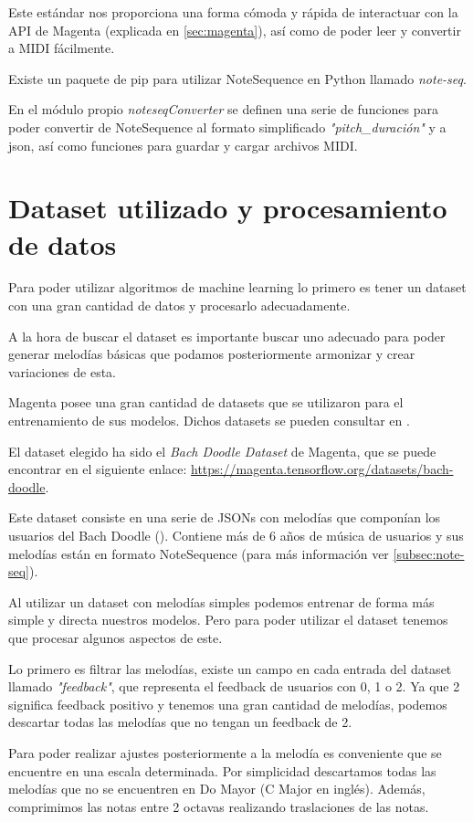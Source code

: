     Este estándar nos proporciona una forma cómoda y rápida de interactuar con la API de Magenta (explicada en \ref{sec:magenta}), así como de poder leer y convertir a MIDI fácilmente.

    Existe un paquete de pip para utilizar NoteSequence en Python llamado \textit{note-seq}.

    En el módulo propio \textit{noteseqConverter} se definen una serie de funciones para poder convertir de NoteSequence al formato simplificado \textit{"pitch\_duración"} y a json, así como funciones para guardar y cargar archivos MIDI.

\section{Dataset utilizado y procesamiento de datos}
\label{sec:dataset}
Para poder utilizar algoritmos de machine learning lo primero es tener un dataset con una gran cantidad de datos y procesarlo adecuadamente.

A la hora de buscar el dataset es importante buscar uno adecuado para poder generar melodías básicas que podamos posteriormente armonizar y crear variaciones de esta.

Magenta posee una gran cantidad de datasets que se utilizaron para el entrenamiento de sus modelos. Dichos datasets se pueden consultar en \cite{MagentaDatasets}.

El dataset elegido ha sido el \textit{Bach Doodle Dataset} de Magenta, que se puede encontrar en el siguiente enlace: \url{https://magenta.tensorflow.org/datasets/bach-doodle}.

Este dataset consiste en una serie de JSONs con melodías que componían los usuarios del Bach Doodle (\cite{BachDoodlePaper}). Contiene más de 6 años de música de usuarios y sus melodías están en formato NoteSequence (para más información ver \ref{subsec:note-seq}).

Al utilizar un dataset con melodías simples podemos entrenar de forma más simple y directa nuestros modelos. Pero para poder utilizar el dataset tenemos que procesar algunos aspectos de este.

Lo primero es filtrar las melodías, existe un campo en cada entrada del dataset llamado \textit{"feedback"}, que representa el feedback de usuarios con 0, 1 o 2. Ya que 2 significa feedback positivo y tenemos una gran cantidad de melodías, podemos descartar todas las melodías que no tengan un feedback de 2.

Para poder realizar ajustes posteriormente a la melodía es conveniente que se encuentre en una escala determinada. Por simplicidad descartamos todas las melodías que no se encuentren en Do Mayor (C Major en inglés). Además, comprimimos las notas entre 2 octavas realizando traslaciones de las notas.

